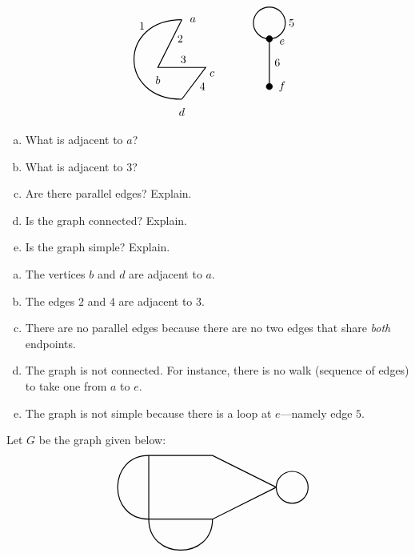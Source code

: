 \documentclass[12pt,letterpaper]{exam}
\begin{document}
\begin{questions}
\[\begin{tikzpicture}
	\node at (1.1,1.5) {$a$};
	\node at (0,-0.4) {$b$};
	\node at (1.7,-0.2) {$c$};
	\node at (0.75,-1.4) {$d$};
	
	\node at (-0.5,1.3) {$1$};
	\node at (0.7,0.9) {$2$};
	\node at (0.8,0.25) {$3$};
	\node at (1.4,-0.6) {$4$};	
	
	\draw[line width=0.03cm] (3.5,-0.6) -- (3.5,0.9); %
	\draw[line width=0.03cm] (3.5,1.4) circle (0.5); %
	\draw[fill=black] (3.5,0.9) circle (0.1); %
	\draw[fill=black] (3.5,-0.6) circle (0.1); %
	
	\node at (4.2,1.4) {$5$};	
	\node at (3.9,0.8) {$e$};
	\node at (3.75,0.15) {$6$};
	\node at (3.9,-0.6) {$f$};	
	
	\draw[line width=0.03cm] (0.75,1.5) to[bend right=90, distance=2cm] (0.75,-1); %
	\draw[line width=0.03cm] (0.75,-1) -- (1.5,0) -- (0,0) -- (0.75,1.5); %
	\end{tikzpicture}
	\]

\begin{enumerate}[(a)]
\item What is adjacent to $a$?
\item What is adjacent to 3?
\item Are there parallel edges? Explain.
\item Is the graph connected? Explain.
\item Is the graph simple? Explain. 
\end{enumerate} \pspace

\sol 
\begin{enumerate}[(a)]
\item The vertices $b$ and $d$ are adjacent to $a$. \pspace

\item The edges $2$ and $4$ are adjacent to $3$. \pspace

\item There are no parallel edges because there are no two edges that share \textit{both} endpoints. \pspace

\item The graph is not connected. For instance, there is no walk (sequence of edges) to take one from $a$ to $e$. \pspace

\item The graph is not simple because there is a loop at $e$---namely edge $5$. 
\end{enumerate}



\newpage
\question[10]  Let $G$ be the graph given below:
	\[
	\begin{tikzpicture}
	\draw[line width=0.03cm] (4,1) -- (2,0) -- (0,0) -- (0,2) -- (2,2) -- (4,1);
	\draw[line width=0.03cm] (0,0) to[bend left=90, distance=1.3cm] (0,2);
	\draw[line width=0.03cm] (0,0) to[bend right=90, distance=1.3cm] (2,0);
	\draw[line width=0.03cm] (4.5,1) circle (0.5);
	

\end{tikzpicture}\]
\end{questions}
\end{document}
